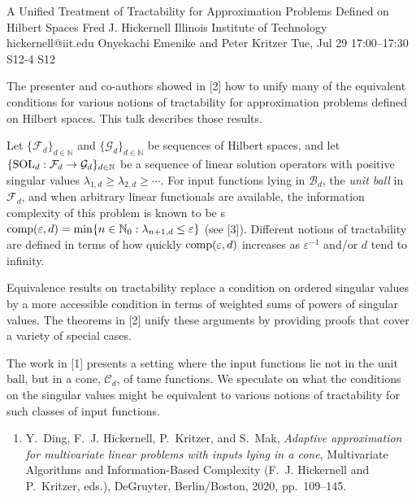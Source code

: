 \begin{talk}
  {A Unified Treatment of Tractability for Approximation Problems Defined on Hilbert Spaces}%
  {Fred J. Hickernell}%
  {Illinois Institute of Technology}%
  {hickernell@iit.edu}%
  {Onyekachi Emenike and Peter Kritzer}%
  {}%
  {Tue, Jul 29 17:00--17:30}%
  {S12-4}%
  {S12}%
  
    
   
The presenter and co-authors showed in [2] how to unify many of the equivalent conditions for various notions of tractability for approximation problems defined on Hilbert spaces.  This talk describes those results.

Let $\{\mathcal{F}_d\}_{d \in \mathbb{N}}$ and $\{\mathcal{G}_d\}_{d \in \mathbb{N}}$ be sequences of Hilbert spaces, and let $\{\textup{SOL}_d : \mathcal{F}_d \to \mathcal{G}_d\}_{d \in \mathbb{N}}$ be a sequence of linear solution operators  with positive singular values $\lambda_{1,d} \ge \lambda_{2,d} \ge \cdots$.  For input functions lying in $\mathcal{B}_d$, the \emph{unit ball} in $\mathcal{F}_d$, and when arbitrary linear functionals are available, the information complexity of this problem is known to be s$\textup{comp}(\varepsilon, d) = \min \{n \in \mathbb{N}_0 : \lambda_{n+1, d} \le \varepsilon\}$ (see [3]).  Different notions of tractability are defined in terms of how quickly $\textup{comp}(\varepsilon, d)$  increases as $\varepsilon^{-1}$ and/or $d$ tend to infinity.

Equivalence results on tractability replace a condition on ordered singular values by a more accessible condition in terms of weighted sums of powers of singular values.  The theorems in [2] unify these arguments by providing proofs that cover a variety of special cases.

The work in [1] presents a setting where the input functions lie not in the unit ball, but in a cone, $\mathcal{C}_d$, of tame functions.  We speculate on what the conditions on the  singular values might be equivalent to various notions of tractability for such classes of input functions.

\begin{enumerate}
\renewcommand{\labelenumi}{[\arabic{enumi}]}
    \item
Y.~Ding, F.~J. Hickernell, P.~Kritzer, and S.~Mak, \emph{Adaptive approximation for multivariate linear problems with inputs lying in a cone}, Multivariate Algorithms and Information-Based Complexity (F.~J. Hickernell and P.~Kritzer, eds.), DeGruyter, Berlin/Boston, 2020, pp.~109--145.


\end{enumerate}
\end{talk}
